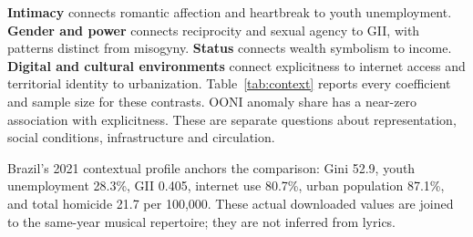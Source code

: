 \documentclass[10pt,a4paper,twocolumn]{article}
\begin{document}
\textbf{Intimacy} connects romantic affection and heartbreak to youth unemployment. \textbf{Gender and power} connects reciprocity and sexual agency to GII, with patterns distinct from misogyny. \textbf{Status} connects wealth symbolism to income. \textbf{Digital and cultural environments} connect explicitness to internet access and territorial identity to urbanization. Table~\ref{tab:context} reports every coefficient and sample size for these contrasts. OONI anomaly share has a near-zero association with explicitness. These are separate questions about representation, social conditions, infrastructure and circulation.

Brazil's 2021 contextual profile anchors the comparison: Gini 52.9, youth unemployment 28.3\%, GII 0.405, internet use 80.7\%, urban population 87.1\%, and total homicide 21.7 per 100,000. These actual downloaded values are joined to the same-year musical repertoire; they are not inferred from lyrics.
\end{document}
